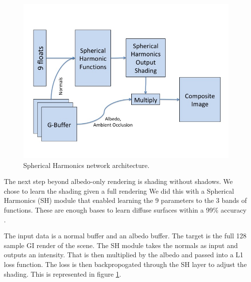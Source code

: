 \documentclass[10pt,twocolumn,letterpaper]{article}
\newcommand{\kris}[1]{{\color{red} KS: #1}}
\newcommand{\tompson}[1]{{\color{green} JT: #1}}
\begin{document}
\begin{figure}[h!]
\centering
\includegraphics[width=1.0\columnwidth]{./assets/SH_model.jpg}
\caption{Spherical Harmonics network architecture.}
\label{fig:SHN}
\end{figure}
The next step beyond albedo-only rendering is shading without shadows. We chose to learn the shading given a full rendering 
We did this with a Spherical Harmonics (SH) module that enabled learning the 9 parameters to the 3 bands of functions.  These are enough bases to learn diffuse surfaces within a 99\% accuracy \cite{Shreiner:2013:OPG:2544032}. 

The input data is a normal buffer and an albedo buffer.  The target is the full 128 sample GI render of the scene.  The SH module takes the normals as input and outputs an intensity.  That is then multiplied by the albedo and passed into a L1 loss function.  The loss is then backpropogated through the SH layer to adjust the shading. This is represented in figure \ref{fig:SHN}.
\end{document}
